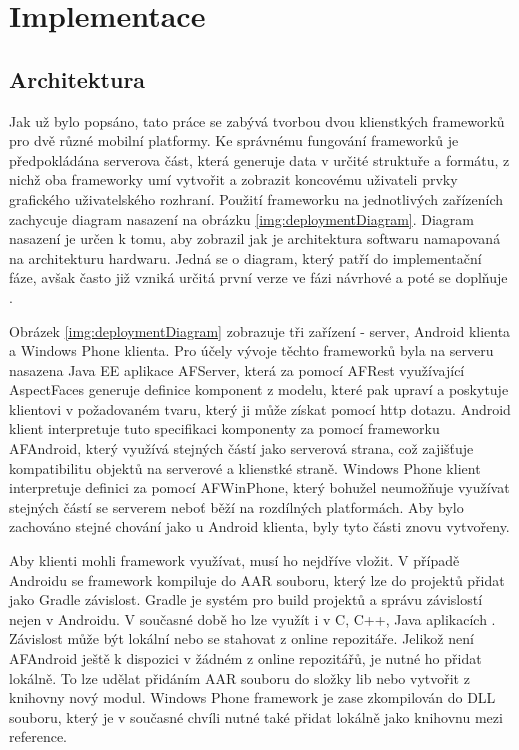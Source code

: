 \chapter{Implementace}
\section{Architektura}
Jak už bylo popsáno, tato práce se zabývá tvorbou dvou klienstkých frameworků pro dvě různé mobilní platformy. Ke správnému fungování frameworků je předpokládána serverova část, která generuje data v určité struktuře a formátu, z nichž oba frameworky umí vytvořit a zobrazit koncovému uživateli prvky grafického uživatelského rozhraní. Použití frameworku na jednotlivých zařízeních zachycuje diagram nasazení na obrázku \ref{img:deploymentDiagram}. Diagram nasazení je určen k tomu, aby zobrazil jak je architektura softwaru namapovaná na architekturu hardwaru. Jedná se o diagram, který patří do implementační fáze, avšak často již vzniká určitá první verze ve fázi návrhové a poté se doplňuje \cite{UmlArlow}.

Obrázek \ref{img:deploymentDiagram} zobrazuje tři zařízení - server, Android klienta a Windows Phone klienta. Pro účely vývoje těchto frameworků byla na serveru nasazena Java EE aplikace AFServer, která za pomocí AFRest \cite{tomasek-thesis} využívající AspectFaces \cite{aspect-faces} generuje definice komponent z modelu, které pak upraví a poskytuje klientovi v požadovaném tvaru, který ji může získat pomocí http dotazu. Android klient interpretuje tuto specifikaci komponenty za pomocí frameworku AFAndroid, který využívá stejných částí jako serverová strana, což zajišťuje kompatibilitu objektů na serverové a klienstké straně. Windows Phone klient interpretuje definici za pomocí AFWinPhone, který bohužel neumožňuje využívat stejných částí se serverem neboť běží na rozdílných platformách. Aby bylo zachováno stejné chování jako u Android klienta, byly tyto části znovu vytvořeny.

Aby klienti mohli framework využívat, musí ho nejdříve vložit. V případě Androidu se framework kompiluje do AAR souboru, který lze do projektů přidat jako Gradle závislost. Gradle je systém pro build projektů a správu závislostí nejen v Androidu. V současné době ho lze využít i v C, C++, Java aplikacích \cite{gradle}. Závislost může být lokální nebo se stahovat z online repozitáře. Jelikož není AFAndroid ještě k dispozici v žádném z online repozitářů, je nutné ho přidat lokálně. To lze udělat přidáním AAR souboru do složky lib nebo vytvořit z knihovny nový modul. Windows Phone framework je zase zkompilován do DLL souboru, který je v současné chvíli nutné také přidat lokálně jako knihovnu mezi reference.

